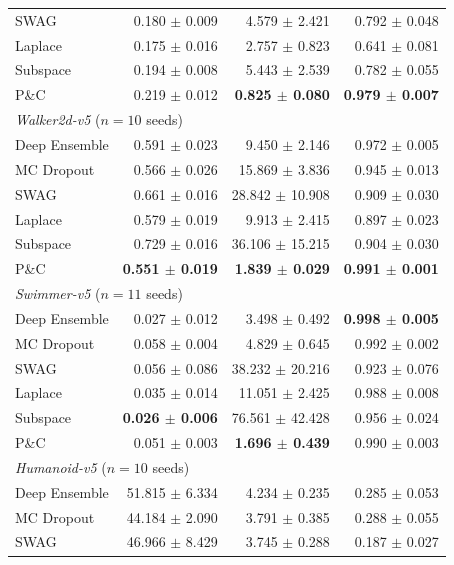 \begin{table}[t]
\begin{tabular}{lrrr}
    SWAG & 0.180 $\pm$ 0.009 & 4.579 $\pm$ 2.421 & 0.792 $\pm$ 0.048 \\
    Laplace & 0.175 $\pm$ 0.016 & 2.757 $\pm$ 0.823 & 0.641 $\pm$ 0.081 \\
    Subspace & 0.194 $\pm$ 0.008 & 5.443 $\pm$ 2.539 & 0.782 $\pm$ 0.055 \\
    P\&C & 0.219 $\pm$ 0.012 & \textbf{0.825 $\pm$ 0.080} & \textbf{0.979 $\pm$ 0.007} \\
    \midrule
    \multicolumn{4}{l}{\textit{Walker2d-v5} ($n=10$ seeds)} \\
    Deep Ensemble & 0.591 $\pm$ 0.023 & 9.450 $\pm$ 2.146 & 0.972 $\pm$ 0.005 \\
    MC Dropout & 0.566 $\pm$ 0.026 & 15.869 $\pm$ 3.836 & 0.945 $\pm$ 0.013 \\
    SWAG & 0.661 $\pm$ 0.016 & 28.842 $\pm$ 10.908 & 0.909 $\pm$ 0.030 \\
    Laplace & 0.579 $\pm$ 0.019 & 9.913 $\pm$ 2.415 & 0.897 $\pm$ 0.023 \\
    Subspace & 0.729 $\pm$ 0.016 & 36.106 $\pm$ 15.215 & 0.904 $\pm$ 0.030 \\
    P\&C & \textbf{0.551 $\pm$ 0.019} & \textbf{1.839 $\pm$ 0.029} & \textbf{0.991 $\pm$ 0.001} \\
    \midrule
    \multicolumn{4}{l}{\textit{Swimmer-v5} ($n=11$ seeds)} \\
    Deep Ensemble & 0.027 $\pm$ 0.012 & 3.498 $\pm$ 0.492 & \textbf{0.998 $\pm$ 0.005} \\
    MC Dropout & 0.058 $\pm$ 0.004 & 4.829 $\pm$ 0.645 & 0.992 $\pm$ 0.002 \\
    SWAG & 0.056 $\pm$ 0.086 & 38.232 $\pm$ 20.216 & 0.923 $\pm$ 0.076 \\
    Laplace & 0.035 $\pm$ 0.014 & 11.051 $\pm$ 2.425 & 0.988 $\pm$ 0.008 \\
    Subspace & \textbf{0.026 $\pm$ 0.006} & 76.561 $\pm$ 42.428 & 0.956 $\pm$ 0.024 \\
    P\&C & 0.051 $\pm$ 0.003 & \textbf{1.696 $\pm$ 0.439} & 0.990 $\pm$ 0.003 \\
    \midrule
    \multicolumn{4}{l}{\textit{Humanoid-v5} ($n=10$ seeds)} \\
    Deep Ensemble & 51.815 $\pm$ 6.334 & 4.234 $\pm$ 0.235 & 0.285 $\pm$ 0.053 \\
    MC Dropout & 44.184 $\pm$ 2.090 & 3.791 $\pm$ 0.385 & 0.288 $\pm$ 0.055 \\
    SWAG & 46.966 $\pm$ 8.429 & 3.745 $\pm$ 0.288 & 0.187 $\pm$ 0.027 \\

\end{tabular}
\end{table}
